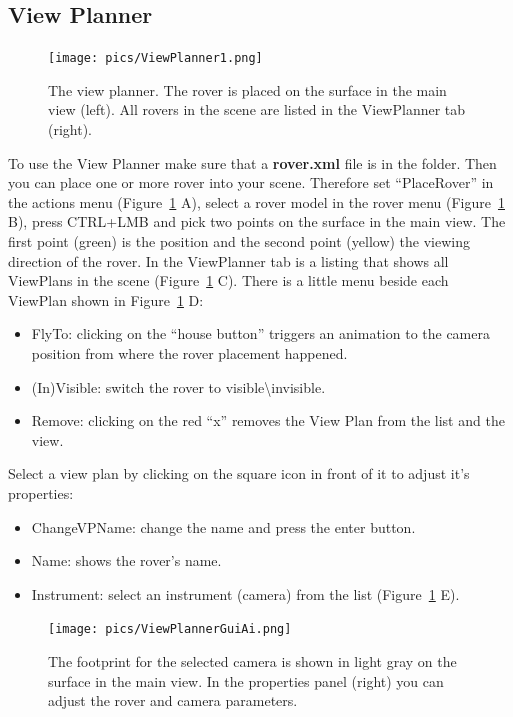 \newpage
\subsection{View Planner}
\label{sec:viewplanner}

\begin{figure}[h]
    	\centering
    		\texttt{[image: pics/ViewPlanner1.png]}
    	\caption[View Planner]{The view planner. The rover is placed on the surface in the main view (left). All rovers in the scene are listed in the ViewPlanner tab (right).}
    	\label{fig:viewPlanner}
   \end{figure}
To use the View Planner make sure that a \textbf{rover.xml} file is in the \textbf{} folder. Then you can place one or more rover into your scene.
Therefore set ``PlaceRover'' in the actions menu (Figure~\ref{fig:viewPlanner} A), select a rover model in the rover menu (Figure~\ref{fig:viewPlanner} B), press CTRL+LMB and pick two points on the surface in the main view. The first point (green) is the position and the second point (yellow) the viewing direction of the rover. In the ViewPlanner tab is a listing that shows all ViewPlans in the scene (Figure~\ref{fig:viewPlanner} C). There is a little menu beside each ViewPlan shown in Figure~\ref{fig:viewPlanner} D:
\begin{itemize}
	\item FlyTo: clicking on the ``house button'' triggers an animation to the camera position from where the rover placement happened.
	\item (In)Visible: switch the rover to visible\textbackslash invisible.
	\item Remove: clicking on the red ``x'' removes the View Plan from the list and the view.
\end{itemize}
Select a view plan by clicking on the square icon in front of it to adjust it's properties:
\begin{itemize}
	\item ChangeVPName: change the name and press the enter button.
	\item Name: shows the rover's name.
	\item Instrument: select an instrument (camera) from the list (Figure~\ref{fig:viewPlanner} E).
\end{itemize}
\begin{figure}[h]
    	\centering
    		\texttt{[image: pics/ViewPlannerGuiAi.png]}
    	\caption[View PlannerGui]{The footprint for the selected camera is shown in light gray on the surface in the main view. In the properties panel (right) you can adjust the rover and camera parameters.}
    	\label{fig:viewPlannerGui}
   \end{figure}
